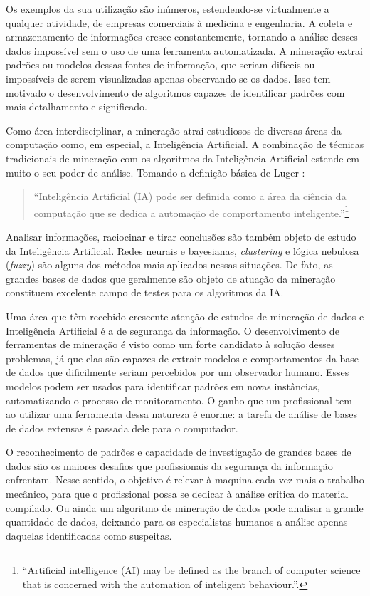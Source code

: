 Os exemplos da sua utilização são inúmeros, estendendo-se virtualmente a qualquer atividade, de empresas comerciais à medicina e engenharia. A coleta e armazenamento de informações cresce constantemente, tornando a análise desses dados impossível sem o uso de uma ferramenta automatizada. A mineração extrai padrões ou modelos dessas fontes de informação, que seriam difíceis ou impossíveis de serem visualizadas apenas observando-se os dados. Isso tem motivado o desenvolvimento de algoritmos capazes de identificar padrões com mais detalhamento e significado.

Como área interdisciplinar, a mineração atrai estudiosos de diversas áreas da computação como, em especial, a Inteligência Artificial. A combinação de técnicas tradicionais de mineração com os algoritmos da Inteligência Artificial estende em muito o seu poder de análise. Tomando a definição básica de Luger \cite[p. 1]{Luger2009}:

\begin{quote}
``Inteligência Artificial (IA) pode ser definida como a área da ciência da computação que se dedica a automação de comportamento inteligente.''\footnote{``Artificial intelligence (AI) may be defined as the branch of computer science that is concerned with the automation of inteligent behaviour.''.}
\end{quote}

Analisar informações, raciocinar e tirar conclusões são também objeto de estudo da Inteligência Artificial. Redes neurais e bayesianas, \emph{clustering} e lógica nebulosa (\emph{fuzzy}) são alguns dos métodos mais aplicados nessas situações. De fato, as grandes bases de dados que geralmente são objeto de atuação da mineração constituem excelente campo de testes para os algoritmos da IA. 

Uma área que têm recebido crescente atenção de estudos de mineração de dados e Inteligência Artificial é a de segurança da informação. O desenvolvimento de ferramentas de mineração é visto como um forte candidato à solução desses problemas, já que elas são capazes de extrair modelos e comportamentos da base de dados que dificilmente seriam percebidos por um observador humano. Esses modelos podem ser usados para identificar padrões em novas instâncias, automatizando o processo de monitoramento. O ganho que um profissional tem ao utilizar uma ferramenta dessa natureza é enorme: a tarefa de análise de bases de dados extensas é passada dele para o computador.

O reconhecimento de padrões e capacidade de investigação de grandes bases de dados são os maiores desafios que profissionais da segurança da informação enfrentam. Nesse sentido, o objetivo é relevar à maquina cada vez mais o trabalho mecânico, para que o profissional possa se dedicar à análise crítica do material compilado. Ou ainda um algoritmo de mineração de dados pode analisar a grande quantidade de dados, deixando para os especialistas humanos a análise apenas daquelas identificadas como suspeitas.

